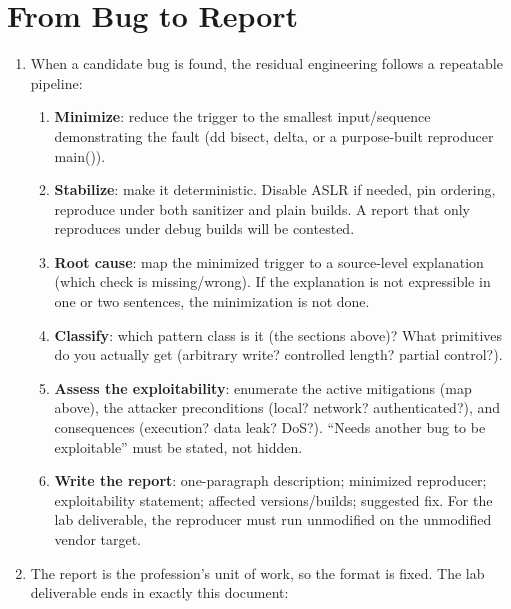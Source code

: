 \documentclass[12pt]{Training}
\begin{document}

\section*{From Bug to Report}
\begin{enumerate}
    \item When a candidate bug is found, the residual engineering follows a repeatable pipeline:
    \begin{enumerate}
        \item \textbf{Minimize}: reduce the trigger to the smallest input/sequence demonstrating the fault (dd bisect, delta, or a purpose-built reproducer main()).
        \item \textbf{Stabilize}: make it deterministic. Disable ASLR if needed, pin ordering, reproduce under both sanitizer and plain builds. A report that only reproduces under debug builds will be contested.
        \item \textbf{Root cause}: map the minimized trigger to a source-level explanation (which check is missing/wrong). If the explanation is not expressible in one or two sentences, the minimization is not done.
        \item \textbf{Classify}: which pattern class is it (the sections above)? What primitives do you actually get (arbitrary write? controlled length? partial control?).
        \item \textbf{Assess the exploitability}: enumerate the active mitigations (map above), the attacker preconditions (local? network? authenticated?), and consequences (execution? data leak? DoS?). ``Needs another bug to be exploitable'' must be stated, not hidden.
        \item \textbf{Write the report}: one-paragraph description; minimized reproducer; exploitability statement; affected versions/builds; suggested fix. For the lab deliverable, the reproducer must run unmodified on the unmodified vendor target.
    \end{enumerate}
    \item The report is the profession's unit of work, so the format is fixed. The lab deliverable ends in exactly this document:
\end{enumerate}
\end{document}

